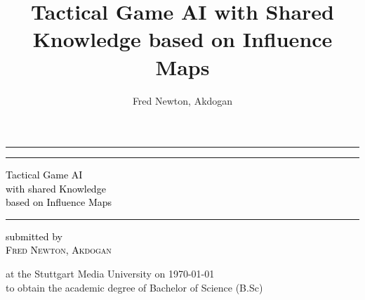 \documentclass[]{report}
\title{Tactical Game AI with Shared Knowledge based on Influence Maps}
\author{Fred Newton, Akdogan}
\begin{document}

\begin{titlepage}
	\centering
	
	
	\rule{\textwidth}{1pt} %
	
	\vspace{2pt}\vspace{-\baselineskip} %
	
	\rule{\textwidth}{0.4pt} %
	{\small {}}
	\vspace{0.1\textheight} %
	
	 
	
	\textcolor{black}{ %
		{\Huge Tactical Game AI}\\[0.5\baselineskip] %
		{\Huge with shared Knowledge}\\[0.5\baselineskip] %
		{\Huge based on Influence Maps} %
	}
	
	\vspace{0.025\textheight}
	
	\rule{0.8\textwidth}{0.4pt}
	
	\vspace{0.1\textheight}
	
	
	\textcolor{black}{ %
		{\small submitted by}\\[0.5\baselineskip] %
		{\Large \textsc{Fred Newton, Akdogan}}\\[0.5\baselineskip] %
	}
	
	\vspace{0.025\textheight} %
	
	{\small at the Stuttgart Media University on \today\\[0.5\baselineskip]}
	{\small to obtain the academic degree of Bachelor of Science (B.Sc)\\[0.5\baselineskip]}
	

\end{titlepage}
\end{document}
